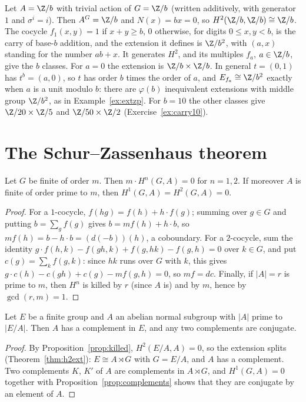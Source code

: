 \begin{example}[carrying]\label{ex:carry}
Let $A=\Z/b$ with trivial action of $G=\Z/b$ (written additively, with generator $1$ and $\sigma^i=i$). Then $A^G=\Z/b$ and $N(x)=bx=0$, so $H^2(\Z/b,\Z/b)\cong\Z/b$. The cocycle $f_1(x,y)=1$ if $x+y\ge b$, $0$ otherwise, for digits
$0\le x,y<b$, is the carry of base-$b$ addition, and the extension it defines is $\Z/b^2$, with $(a,x)$ standing for the number $ab+x$. It generates $H^2$, and its multiples $f_a$, $a\in\Z/b$, give the $b$ classes. For $a=0$ the
extension is $\Z/b\times\Z/b$. In general $t=(0,1)$ has $t^b=(a,0)$, so $t$ has order $b$ times the order of $a$, and $E_{f_a}\cong\Z/b^2$ exactly when $a$ is a unit modulo $b$: there are $\varphi(b)$ inequivalent extensions with
middle group $\Z/b^2$, as in Example~\ref{ex:extzp}. For $b=10$ the other classes give $\Z/20\times\Z/5$ and $\Z/50\times\Z/2$ (Exercise~\ref{ex:carry10}).
\end{example}

\section{The Schur--Zassenhaus theorem}

\begin{proposition}\label{prop:killed}
Let $G$ be finite of order $m$. Then $m\cdot H^n(G,A)=0$ for $n=1,2$. If moreover $A$ is finite of order prime to $m$, then $H^1(G,A)=H^2(G,A)=0$.
\end{proposition}

\begin{proof}
For a $1$-cocycle, $f(hg)=f(h)+h\cdot f(g)$; summing over $g\in G$ and putting $b=\sum_gf(g)$ gives $b=mf(h)+h\cdot b$, so $mf(h)=b-h\cdot b=(d(-b))(h)$, a coboundary. For a $2$-cocycle, sum the identity
$g\cdot f(h,k)-f(gh,k)+f(g,hk)-f(g,h)=0$ over $k\in G$, and put $c(g)=\sum_kf(g,k)$: since $hk$ runs over $G$ with $k$, this gives $g\cdot c(h)-c(gh)+c(g)-mf(g,h)=0$, so $mf=dc$. Finally, if $|A|=r$ is prime to $m$, then
$H^n$ is killed by $r$ (since $A$ is) and by $m$, hence by $\gcd(r,m)=1$.
\end{proof}

\begin{theorem}\label{thm:sz}
Let $E$ be a finite group and $A$ an abelian normal subgroup with $|A|$ prime to $|E/A|$. Then $A$ has a complement in $E$, and any two complements are conjugate.
\end{theorem}

\begin{proof}
By Proposition~\ref{prop:killed}, $H^2(E/A,A)=0$, so the extension splits (Theorem~\ref{thm:h2ext}): $E\cong A\rtimes G$ with $G=E/A$, and $A$ has a complement. Two complements $K$, $K'$ of $A$ are complements in $A\rtimes G$,
and $H^1(G,A)=0$ together with Proposition~\ref{prop:complements} shows that they are conjugate by an element of $A$.
\end{proof}

